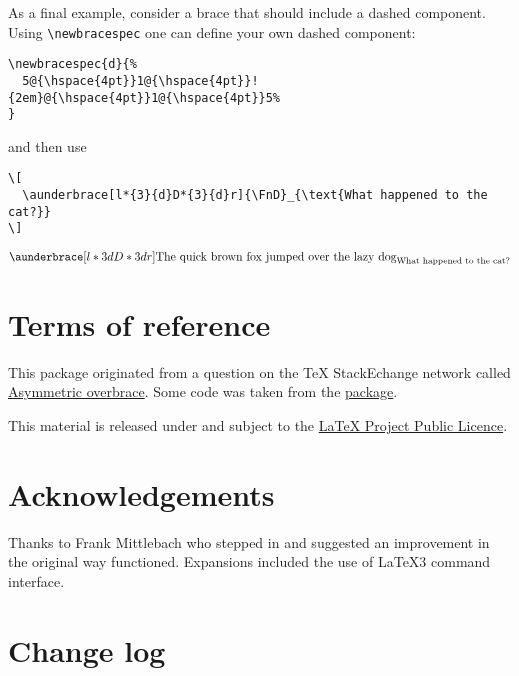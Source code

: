 \documentclass[10pt]{ltxdockit}[2011/03/25]
\begin{document}
As a final example, consider a brace that should include a dashed component. Using \lstinline|\newbracespec| one can define your own dashed component:
\begin{lstlisting}
\newbracespec{d}{%
  5@{\hspace{4pt}}1@{\hspace{4pt}}!{2em}@{\hspace{4pt}}1@{\hspace{4pt}}5%
}
\end{lstlisting}
\noindent and then use
\begin{lstlisting}
\[
  \aunderbrace[l*{3}{d}D*{3}{d}r]{\FnD}_{\text{What happened to the cat?}}
\]
\end{lstlisting}
\[
  \newbracespec{d}{1@{\hspace{4pt}}1@{\hspace{4pt}}!{1em}@{\hspace{4pt}}1@{\hspace{4pt}}1}
  \aunderbrace[l*{3}{d}D*{3}{d}r]{\FnD}_{\text{What happened to the cat?}}
\]

\section{Terms of reference}

This package originated from a question on the TeX StackEchange network called \href{http://tex.stackexchange.com/q/68526/5764}{Asymmetric overbrace}. Some code was taken from the \href{http://ctan.org/pkg/mathtools}{ package}.

This material is released under and subject to the \href{https://latex-project.org/lppl/}{LaTeX Project Public Licence}.

\section{Acknowledgements}

Thanks to Frank Mittlebach who stepped in and suggested an improvement in the original way  functioned. Expansions included the use of \LaTeX3 command interface.

\section{Change log}
\end{document}
